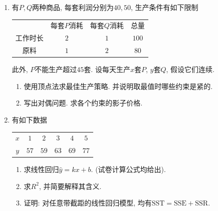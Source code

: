 \begin{enumerate}
\begin{enumerate}[label=(\arabic*)]
    \item 用Dijkstra算法求$A\to F$最短路.
    \item 如果需要经过$C$, 请简述计算方法.
\end{enumerate}
\item 有$P,Q$两种商品, 每套利润分别为$40,50$, 生产条件有如下限制
\begin{center}\begin{tabular}{c|cc|c}
    &每套$P$消耗&每套$Q$消耗&总量\\
    工作时长&$2$&$1$&$100$\\
    原料&$1$&$2$&$80$
\end{tabular}\end{center}
此外, $P$不能生产超过$45$套. 设每天生产$x$套$P$, $y$套$Q$, 假设它们连续.
\begin{enumerate}[label=(\arabic*)]
    \item 使用顶点法求最佳生产策略. 并说明取最值时哪些约束是紧的.
    \item 写出对偶问题. 求各个约束的影子价格.
\end{enumerate}
\item 有如下数据
\begin{center}\begin{tabular}{c|ccccc}
    $x$&$1$&$2$&$3$&$4$&$5$\\
    $y$&$57$&$59$&$63$&$69$&$77$
\end{tabular}\end{center}
\begin{enumerate}[label=(\arabic*)]
    \item 求线性回归$\hat{y}=kx+b$. (试卷计算公式均给出).
    \item 求$R^2$, 并简要解释其含义.
    \item 证明: 对任意带截距的线性回归模型, 均有$\text{SST}=\text{SSE}+\text{SSR}$.
\end{enumerate}
\end{enumerate}


